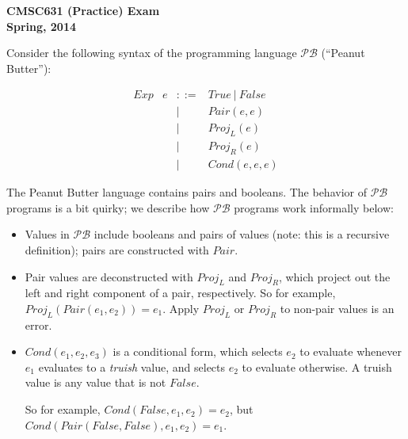 \documentclass[11pt]{article}
\newcommand\mexp{e}
\newcommand\True{\mathit{True}}
\newcommand\False{\mathit{False}}
\newcommand\Plang{\mathcal{PB}}
\begin{document}
\begin{center}
{\bf CMSC631 (Practice) Exam}\\
{\bf Spring, 2014}
\end{center}


\def\ExerciseName{Problem}

Consider the following syntax of the programming language $\Plang$ (``Peanut Butter''):

\newcommand\Cons{\mathit{Pair}}
\newcommand\Nil{\mathit{Nil}}
\newcommand\IsNil{\mathit{IsNil}}
\newcommand\ProjL{\mathit{Proj_L}}
\newcommand\ProjR{\mathit{Proj_R}}
\newcommand\Cond{\mathit{Cond}}
\newcommand\List{\mathit{List}}

\[
\begin{array}{lrcll}
 \mathit{Exp} 
               & e & ::= & \True\ |\ \False\\
               &   & |   & \Cons(\mexp,\mexp)\\
               &   & |   & \ProjL(e)\\
               &   & |   & \ProjR(e)\\
               &   & |   & \Cond(e,e,e)
\end{array}
\]

The Peanut Butter language contains pairs and booleans.  The behavior
of $\Plang$ programs is a bit quirky; we describe how $\Plang$
programs work informally below:

\begin{itemize}
\item Values in $\Plang$ include booleans and pairs of values (note:
  this is a recursive definition); pairs are constructed with $\Cons$.

\item Pair values are deconstructed with $\ProjL$ and $\ProjR$, which
  project out the left and right component of a pair, respectively.
  So for example, $\ProjL(\Cons(\mexp_1,\mexp_2)) = \mexp_1$.
  Apply $\ProjL$ or $\ProjR$ to non-pair values is an error.

\item $\Cond(\mexp_1,\mexp_2,\mexp_3)$ is a conditional form, which
  selects $\mexp_2$ to evaluate whenever $\mexp_1$ evaluates to a
  \emph{truish} value, and selects $\mexp_2$ to evaluate otherwise.  A
  truish value is any value that is not $\False$.

  So for example, $\Cond(\False, \mexp_1, \mexp_2) = \mexp_2$, but
  $\Cond(\Cons(\False,\False),\mexp_1,\mexp_2) = \mexp_1$.
\end{itemize}
\end{document}
